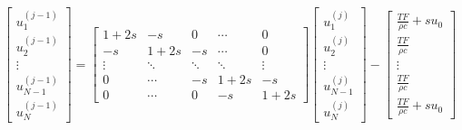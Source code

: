 \documentclass{article}
\begin{document}
\begin{equation}
\begin{bmatrix}
    u_1^{(j-1)} \\
    u_2^{(j-1)} \\
    \vdots \\
    u_{N-1}^{(j-1)} \\
    u_N^{(j-1)}
\end{bmatrix}
=
\begin{bmatrix}
    1+2s & -s & 0 & \cdots & 0 \\
    -s & 1+2s & -s & \cdots & 0 \\
    \vdots & \ddots & \ddots & \ddots & \vdots \\
    0 & \cdots & -s & 1+2s & -s \\
    0 & \cdots & 0 & -s & 1+2s
\end{bmatrix}
\begin{bmatrix}
    u_1^{(j)} \\
    u_2^{(j)} \\
    \vdots \\
    u_{N-1}^{(j)} \\
    u_N^{(j)}
\end{bmatrix}
-
\begin{bmatrix}
    \frac{TF}{\rho c} +su_0 \\
    \frac{TF}{\rho c} \\
    \vdots \\
    \frac{TF}{\rho c} \\
    \frac{TF}{\rho c} + su_0
\end{bmatrix}
\end{equation}
\end{document}
